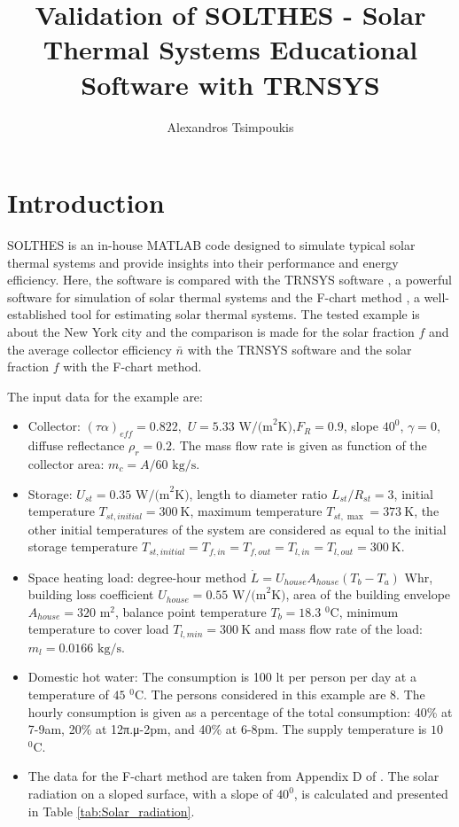 \documentclass{article}
\title{Validation of SOLTHES - Solar Thermal Systems Educational Software with TRNSYS}
\author{Alexandros Tsimpoukis}
\date{ }
\begin{document}
\maketitle


\section{Introduction}
SOLTHES is an in-house MATLAB code designed to simulate typical solar thermal systems and provide insights into their performance and energy efficiency. Here, the software is compared with the TRNSYS software \cite{Klein2020}, a powerful software for simulation of solar thermal systems and the F-chart method \cite{Beckman2021}, a well-established tool for estimating solar thermal systems. The tested example is about the New York city and the comparison is made for the solar fraction $f$ and the average collector efficiency $\bar{n}$ with the TRNSYS software and the solar fraction $f$ with the F-chart method.

The input data for the example are:
\begin{itemize}
\item
    Collector: ${{\left( \tau \alpha  \right)}_{eff}}=0.822,$ $U=5.33$ $\text{W/(m}^2 \text{K})$,${{F}_{R}}=0.9$, slope $40^0$, $\gamma =0$, diffuse reflectance ${{\rho }_{r}}=0.2$. The mass flow rate is given as function of the collector area: ${{m}_{c}}={A}/{60}$ ${\text{kg}}/{\text{s}}$.
\item   
    Storage: ${{U}_{st}}=0.35$ $\text{W/(m}^2 \text{K})$, length to diameter ratio ${{{L}_{st}}}/{{{R}_{st}}}=3$, initial temperature ${{T}_{st,initial}}=300\ \text{K}$, maximum temperature ${{T}_{st,\max }}=373\ \text{K}$, the other initial temperatures of the system are considered as equal to the initial storage temperature ${{T}_{st,initial}}={{T}_{f,in}}={{T}_{f,out}}={{T}_{l,in}}={{T}_{l,out}}=300\ \text{K}$.
\item 
    Space heating load: degree-hour method $\dot{L}={{U}_{house}}{{A}_{house}}\left( {{T}_{b}}-{{T}_{a}} \right)$ $\text{Whr}$, building loss coefficient ${{U}_{house}}=0.55$ $\text{W/(m}^2 \text{K})$, area of the building envelope ${{A}_{house}}=320$ $\text{m}^2$, balance point temperature ${{T}_{b}}=18.3$ $^{\text{0}}\text{C}$, minimum temperature to cover load ${{T}_{l,min}}=300\ \text{K}$ and mass flow rate of the load: ${{m}_{l}}=0.0166$ ${\text{kg}}/{\text{s}}$.
\item 
    Domestic hot water: The consumption is 100 lt per person per day at a temperature of $45$ $^{\text{0}}\text{C}$. The persons considered in this example are 8. The hourly consumption is given as a percentage of the total consumption: 40\% at 7-9am, 20\% at 12π.μ-2pm, and 40\% at 6-8pm. The supply temperature is $10$ $^{\text{0}}\text{C}$.
\item 
    The data for the F-chart method are taken from Appendix D of \cite{Beckman2021}. The solar radiation on a sloped surface, with a slope of $40^0$, is calculated and presented in Table \ref{tab:Solar_radiation}.
 \end{itemize}
\end{document}
